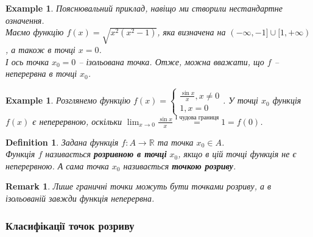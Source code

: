 \documentclass[a4paper, 14pt]{article}
\theoremstyle{theoremdd}
\theoremstyle{theoremdd}
\newtheorem{definition}[theorem]{Definition}
\theoremstyle{theoremdd}
\theoremstyle{theoremdd}
\newtheorem{example}[theorem]{Example}
\theoremstyle{theoremdd}
\theoremstyle{theoremdd}
\newtheorem{remark}[theorem]{Remark}
\theoremstyle{theoremdd}
\theoremstyle{theoremdd}
\begin{document}
\begin{example}
Пояснювальний приклад, навіщо ми створили нестандартне означення.\\
Маємо функцію $f(x) = \sqrt{x^2(x^2-1)}$, яка визначена на $(-\infty,-1] \cup [1,+\infty)$, а також в точці $x = 0$.\\
І ось точка $x_0 = 0$ -- ізольована точка. Отже, можна вважати, що $f$ -- неперервна в точці $x_0$.
\\ \iffalse %
\begin{figure}[H]
\centering
\begin{tikzpicture}
\draw[thick,->] (-2.1,0)--(2.1,0) node[anchor = north] {$x$};
\draw[thick,->] (0,-0.5)--(0,4) node[anchor = east] {$y$};
\draw[thick, domain=-2:-1, variable=\x, samples = 500] plot({\x}, {sqrt(\x*\x*(\x*\x-1))}) node at (0.2,-0.2) {$0$};
\fill(0,0) circle (2pt);
\draw[thick, domain=1:2, variable=\x, samples = 500] plot({\x}, {sqrt(\x*\x*(\x*\x-1))}) node[anchor = north west, scale=0.8] {$f(x) = \sqrt{x^2(x^2-1)}$};

\node at (1,-0.2) {$1$};
\node at (-1,-0.2) {$-1$};
\end{tikzpicture}
\end{figure}
\fi %
\end{example}

\begin{example}
Розглянемо функцію $f(x) = \begin{cases} \displaystyle \frac{\sin x}{x}, x \neq 0 \\ 1, x = 0 \end{cases}$. У точці $x_0$ функція $f(x)$ є неперервною, оскільки
$\displaystyle \lim_{x \to 0} \frac{\sin x}{x} \overset{\textrm{I чудова границя}}{=} 1 = f(0)$.
\end{example}

\begin{definition}
Задана функція $f \colon A \to \mathbb{R}$ та точка $x_0 \in A$.\\
Функція $f$ називається \textbf{розривною в точці} $x_0$, якщо в цій точці функція не є неперервною. А сама точка $x_0$ називається \textbf{точкою розриву}.
\end{definition}

\begin{remark}
Лише граничні точки можуть бути точками розриву, а в ізольованій завжди функція неперервна.
\end{remark}

\subsubsection*{Класифікації точок розриву}
\end{document}
